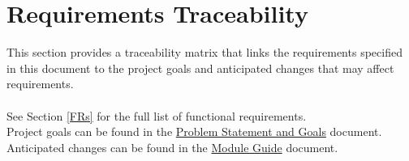 \documentclass[12pt]{article}
\begin{document}
\section{Requirements Traceability}
This section provides a traceability matrix that links the requirements specified in this document to the project goals and anticipated changes that may affect requirements.\\\\
See Section \ref{FRs} for the full list of functional requirements.\\
Project goals can be found in the \href{https://github.com/emilyperica/ScoreGen/blob/9c65d271707b13d38bbabc3336cb566b20affe99/docs/ProblemStatementAndGoals/ProblemStatement.pdf}{Problem Statement and Goals} 
document. Anticipated changes can be found in the \href{https://github.com/emilyperica/ScoreGen/blob/9c65d271707b13d38bbabc3336cb566b20affe99/docs/Design/SoftArchitecture/MG.pdf}{Module Guide} document.\\
\end{document}
